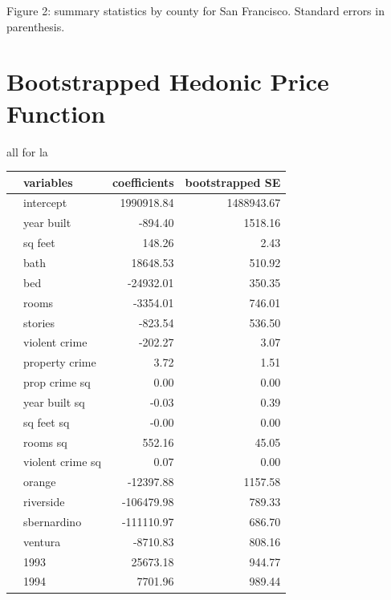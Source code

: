 \documentclass[12pt,a4paper]{article}
\begin{document}
\begin{center}
Figure 2: summary statistics by county for San Francisco. Standard errors in parenthesis.
\end{center}
\newpage

\section{Bootstrapped Hedonic Price Function}
all for la

\begin{center}
\begin{tabular}{llrr}
\hline
\hline
&         variables &  coefficients &  bootstrapped SE \\
\hline
\hline
&         intercept &    1990918.84 &       1488943.67 \\
&        year built &       -894.40 &          1518.16 \\
&           sq feet &        148.26 &             2.43 \\
&              bath &      18648.53 &           510.92 \\
&               bed &     -24932.01 &           350.35 \\
&             rooms &      -3354.01 &           746.01 \\
&           stories &       -823.54 &           536.50 \\
&     violent crime &       -202.27 &             3.07 \\
&    property crime &          3.72 &             1.51 \\
&     prop crime sq &          0.00 &             0.00 \\
&     year built sq &         -0.03 &             0.39 \\
&        sq feet sq &         -0.00 &             0.00 \\
&          rooms sq &        552.16 &            45.05 \\
&  violent crime sq &          0.07 &             0.00 \\
&            orange &     -12397.88 &          1157.58 \\
&         riverside &    -106479.98 &           789.33 \\
&       sbernardino &    -111110.97 &           686.70 \\
&           ventura &      -8710.83 &           808.16 \\
 &              1993 &      25673.18 &           944.77 \\
&              1994 &       7701.96 &           989.44 \\

\end{tabular}
\end{center}
\end{document}
